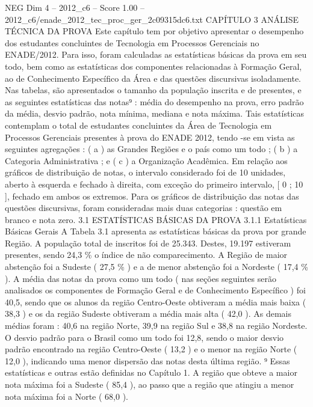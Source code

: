 \begin{textsample}{NEG Dim 4 – 2012\_c6 – Score 1.00 – 2012\_c6/enade\_2012\_tec\_proc\_ger\_2c09315dc6.txt}  \label{ex:f4_neg_230}
CAPÍTULO 3 ANÁLISE TÉCNICA DA PROVA Este capítulo tem por objetivo apresentar o desempenho dos estudantes concluintes de Tecnologia em Processos Gerenciais no ENADE/2012.
Para isso, foram calculadas as estatísticas básicas da prova em seu todo, bem como as estatísticas dos componentes relacionadas à Formação Geral, ao de Conhecimento Específico da Área e das questões discursivas isoladamente.
Nas tabelas, são apresentados o tamanho da população inscrita e de presentes, e as seguintes estatísticas das notas⁹ : média do desempenho na prova, erro padrão da média, desvio padrão, nota mínima, mediana e nota máxima.
Tais estatísticas contemplam o total de estudantes concluintes da Área de Tecnologia em Processos Gerenciais presentes à prova do ENADE 2012, tendo -se em vista as seguintes agregações : ( a ) as Grandes Regiões e o país como um todo ; ( b ) a Categoria Administrativa ; e ( c ) a Organização Acadêmica.
Em relação aos gráficos de distribuição de notas, o intervalo considerado foi de 10 unidades, aberto à esquerda e fechado à direita, com exceção do primeiro intervalo, [ 0 ; 10 ], fechado em ambos os extremos.
Para os gráficos de distribuição das notas das questões discursivas, foram consideradas mais duas categorias : questão em branco e nota zero. 3.1 ESTATÍSTICAS BÁSICAS DA PROVA 3.1.1 Estatísticas Básicas Gerais A Tabela 3.1 apresenta as estatísticas básicas da prova por grande Região.
A população total de inscritos foi de 25.343.
Destes, 19.197 estiveram presentes, sendo 24,3 \% o índice de não comparecimento.
A Região de maior abstenção foi a Sudeste ( 27,5 \% ) e a de menor abstenção foi a Nordeste ( 17,4 \% ).
A média das notas da prova como um todo ( nas seções seguintes serão analisados os componentes de Formação Geral e de Conhecimento Específico ) foi 40,5, sendo que os alunos da região Centro-Oeste obtiveram a média mais baixa ( 38,3 ) e os da região Sudeste obtiveram a média mais alta ( 42,0 ).
As demais médias foram : 40,6 na região Norte, 39,9 na região Sul e 38,8 na região Nordeste.
O desvio padrão para o Brasil como um todo foi 12,8, sendo o maior desvio padrão encontrado na região Centro-Oeste ( 13,2 ) e o menor na região Norte ( 12,0 ), indicando uma menor dispersão das notas desta última região. ⁹ Essas estatísticas e outras estão definidas no Capítulo 1.
A região que obteve a maior nota máxima foi a Sudeste ( 85,4 ), ao passo que a região que atingiu a menor nota máxima foi a Norte ( 68,0 ).

\end{textsample}
